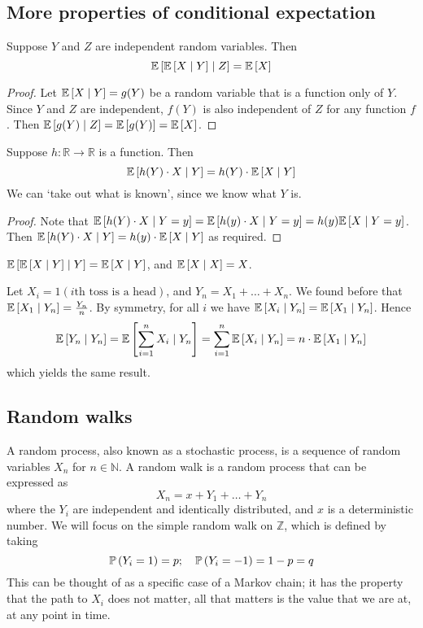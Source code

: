 \subsection{More properties of conditional expectation}
\begin{proposition}
	Suppose \(Y\) and \(Z\) are independent random variables.
	Then
	\[
		\mathbb{E}\left[{\mathbb{E}\left[{X \mid Y}\right] \mid Z}\right] = \mathbb{E}\left[{X}\right]
	\]
\end{proposition}
\begin{proof}
	Let \(\mathbb{E}\left[{X \mid Y}\right] = g(Y)\) be a random variable that is a function only of \(Y\).
	Since \(Y\) and \(Z\) are independent, \(f(Y)\) is also independent of \(Z\) for any function \(f\).
	Then \(\mathbb{E}\left[{g(Y) \mid Z}\right] = \mathbb{E}\left[{g(Y)}\right] = \mathbb{E}\left[{X}\right]\).
\end{proof}
\begin{proposition}
	Suppose \(h \colon \mathbb R \to \mathbb R\) is a function.
	Then
	\[
		\mathbb{E}\left[{h(Y) \cdot X \mid Y}\right] = h(Y) \cdot \mathbb{E}\left[{X \mid Y}\right]
	\]
	We can `take out what is known', since we know what \(Y\) is.
\end{proposition}
\begin{proof}
	Note that \(\mathbb{E}\left[{h(Y) \cdot X \mid Y = y}\right] = \mathbb{E}\left[{h(y) \cdot X \mid Y = y}\right] = h(y) \mathbb{E}\left[{X \mid Y = y}\right]\).
	Then \(\mathbb{E}\left[{h(Y) \cdot X \mid Y}\right] = h(y) \cdot \mathbb{E}\left[{X \mid Y}\right]\) as required.
\end{proof}
\begin{corollary}
	\(\mathbb{E}\left[{\mathbb{E}\left[{X \mid Y}\right] \mid Y}\right] = \mathbb{E}\left[{X \mid Y}\right]\), and \(\mathbb{E}\left[{X \mid X}\right] = X\).
\end{corollary}
\noindent Let \(X_i = 1(i\text{th toss is a head})\), and \(Y_n = X_1 + \dots + X_n\).
We found before that \(\mathbb{E}\left[{X_1 \mid Y_n}\right] = \frac{Y_n}{n}\).
By symmetry, for all \(i\) we have \(\mathbb{E}\left[{X_i \mid Y_n}\right] = \mathbb{E}\left[{X_1 \mid Y_n}\right]\).
Hence
\[
	\mathbb{E}\left[{Y_n \mid Y_n}\right] = \mathbb{E}\left[{\sum_{i=1}^n X_i \mid Y_n}\right] = \sum_{i=1}^n \mathbb{E}\left[{X_i \mid Y_n}\right] = n \cdot \mathbb{E}\left[{X_1 \mid Y_n}\right]
\]
which yields the same result.

\subsection{Random walks}
A random process, also known as a stochastic process, is a sequence of random variables \(X_n\) for \(n \in \mathbb N\).
A random walk is a random process that can be expressed as
\[
	X_n = x + Y_1 + \dots + Y_n
\]
where the \(Y_i\) are independent and identically distributed, and \(x\) is a deterministic number.
We will focus on the simple random walk on \(\mathbb Z\), which is defined by taking
\[
	\mathbb{P}\left({Y_i = 1}\right) = p;\quad \mathbb{P}\left({Y_i = -1}\right) = 1-p = q
\]
This can be thought of as a specific case of a Markov chain; it has the property that the path to \(X_i\) does not matter, all that matters is the value that we are at, at any point in time.

